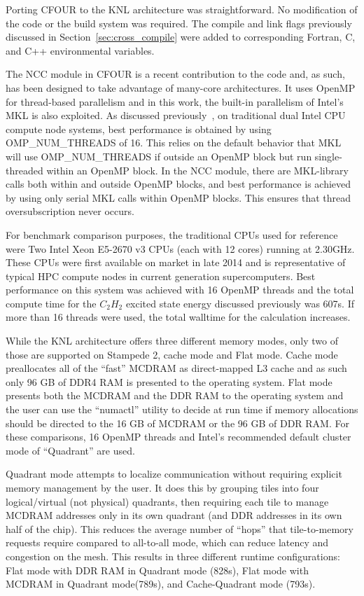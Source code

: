Porting CFOUR to the KNL architecture was straightforward. No modification of the code or the build
system was required. The compile and link flags previously discussed in Section~\ref{sec:cross_compile}
were added to corresponding Fortran, C, and C++ environmental variables.

The NCC module in CFOUR is a recent contribution to the code and, as such, has been designed to take
advantage of many-core architectures. It uses OpenMP for thread-based parallelism and in this work, the
built-in parallelism of Intel's MKL is also exploited. As discussed previously~\cite{ncc:15},
on traditional dual Intel CPU compute node systems, best performance is obtained 
by using OMP\_NUM\_THREADS of 16. This relies on the default behavior that MKL will use OMP\_NUM\_THREADS 
if outside an OpenMP block but run single-threaded within an OpenMP block. 
In the NCC module, there are MKL-library calls both within and outside OpenMP blocks, and best performance is 
achieved by using only serial MKL calls within OpenMP blocks. This ensures that thread oversubscription never occurs.

For benchmark comparison purposes, the traditional CPUs used for reference were Two Intel Xeon E5-2670 v3 CPUs
(each with 12 cores) running at 2.30GHz. These CPUs were first available on market in late 2014 and is 
representative of typical HPC compute nodes in current generation supercomputers. Best performance on this 
system was achieved with 16 OpenMP threads and the total compute time for the $C_2H_2$ excited state energy 
discussed previously was 607s.
If more than 16 threads were used, the total walltime for the calculation increases. 

While the KNL architecture offers three different memory modes, only two of those are supported on Stampede 2,
cache mode and Flat mode. Cache mode preallocates all of the ``fast'' MCDRAM as direct-mapped L3 cache and
as such only 96 GB of DDR4 RAM is presented to the operating system. Flat mode presents both the MCDRAM and the 
DDR RAM to the operating system and the user can use the ``numactl'' utility to decide at run time if memory 
allocations should be directed to the 16 GB of MCDRAM or the 96 GB of DDR RAM. For these comparisons, 16 OpenMP
threads and Intel's recommended default cluster mode of ``Quadrant'' are used.

Quadrant mode attempts to localize communication without requiring explicit memory management by the user. 
It does this by grouping tiles into four logical/virtual (not physical) quadrants, then requiring each tile 
to manage MCDRAM addresses only in its own quadrant (and DDR addresses in its own half of the chip). 
This reduces the average number of ``hops'' that tile-to-memory requests require compared to all-to-all mode, 
which can reduce latency and congestion on the mesh. This results in three different runtime configurations:
Flat mode with DDR RAM in Quadrant mode (828s), Flat mode with MCDRAM in Quadrant mode(789s), and
Cache-Quadrant mode (793s). 

